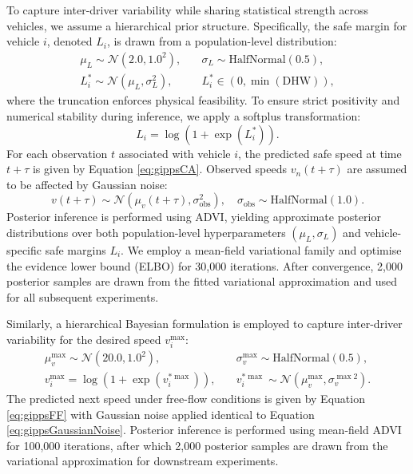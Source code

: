 \documentclass[journal]{IEEEtran}
\begin{document}
To capture inter-driver variability while sharing statistical strength across vehicles, we assume a hierarchical prior structure. Specifically, the safe margin for vehicle $i$, denoted $L_i$, is drawn from a population-level distribution:
\begin{align*}
    \mu_L\sim\mathcal{N}(2.0, 1.0^2),&\quad \sigma_L\sim\text{HalfNormal}(0.5), \\
    L_i^*\sim\mathcal{N}(\mu_L,\sigma_L^2),&\quad L_i^*\in(0, \min(\text{DHW})),
\end{align*}
where the truncation enforces physical feasibility. To ensure strict positivity and numerical stability during inference, we apply a softplus transformation:
\begin{equation}
L_i=\log(1+\exp(L_i^*)).
\end{equation}
For each observation $t$ associated with vehicle $i$, the predicted safe speed at time $t+\tau$ is given by Equation \ref{eq:gippsCA}. Observed speeds $v_n(t+\tau)$ are assumed to be affected by Gaussian noise:
\begin{equation}\label{eq:gippsGaussianNoise}
v(t+\tau)\sim\mathcal{N}(\mu_v(t+\tau), \sigma_{\text{obs}}^2),\quad \sigma_{\text{obs}}\sim\text{HalfNormal}(1.0).
\end{equation}
Posterior inference is performed using ADVI, yielding approximate posterior distributions over both population-level hyperparameters $(\mu_L,\sigma_L)$ and vehicle-specific safe margins $L_i$. We employ a mean-field variational family and optimise the evidence lower bound (ELBO) for 30,000 iterations. After convergence, 2,000 posterior samples are drawn from the fitted variational approximation and used for all subsequent experiments.

Similarly, a hierarchical Bayesian formulation is employed to capture inter-driver variability for the desired speed $v_i^{\max}$:
\begin{align*}
    \mu_v^{\max}\sim\mathcal{N}(20.0, 1.0^2),&\quad \sigma_v^{\max}\sim\text{HalfNormal}(0.5), \\
    v_i^{\max}=\log(1+\exp(v_i^{*\max})),&\quad v_i^{*\max}\sim\mathcal{N}(\mu_v^{\max} ,\sigma_v^{\max 2}).
\end{align*}
The predicted next speed under free-flow conditions is given by Equation \ref{eq:gippsFF} with Gaussian noise applied identical to Equation \ref{eq:gippsGaussianNoise}. Posterior inference is performed using mean-field ADVI for 100,000 iterations, after which 2,000 posterior samples are drawn from the variational approximation for downstream experiments.
\end{document}
